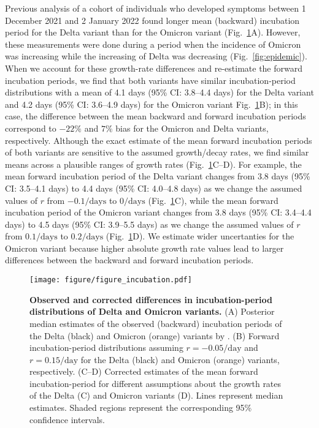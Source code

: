 \documentclass[12pt]{article}
\newcommand{\fref}[1]{Fig.~\ref{fig:#1}}
\begin{document}
Previous analysis of a cohort of individuals who developed symptoms between 1 December 2021 and 2 January 2022 found longer mean (backward) incubation period for the Delta variant than for the Omicron variant \citep{backer2021omicron} (\fref{incubation}A).
However, these measurements were done during a period when the incidence of Omicron was increasing while the increasing of Delta was decreasing (\fref{epidemic}).
When we account for these growth-rate differences and re-estimate the forward incubation periods, we find that both variants have similar incubation-period distributions with a mean of 4.1 days (95\% CI: 3.8--4.4 days) for the Delta variant and 4.2 days (95\% CI: 3.6--4.9 days) for the Omicron variant \fref{incubation}B);
in this case, the difference between the mean backward and forward incubation periods correspond to $-22\%$ and $7\%$ bias for the Omicron and Delta variants, respectively.
Although the exact estimate of the mean forward incubation periods of both variants are sensitive to the assumed growth/decay rates, we find similar means across a plausible ranges of growth rates (\fref{incubation}C--D).
For example, the mean forward incubation period of the Delta variant changes from 3.8 days (95\% CI: 3.5--4.1 days) to 4.4 days (95\% CI: 4.0--4.8 days) as we change the assumed values of $r$ from $-0.1/\mathrm{days}$ to $0/\mathrm{days}$ (\fref{incubation}C),
while the mean forward incubation period of the Omicron variant changes from 3.8 days (95\% CI: 3.4--4.4 days) to 4.5 days (95\% CI: 3.9--5.5 days) as we change the assumed values of $r$ from $0.1/\mathrm{days}$ to $0.2/\mathrm{days}$ (\fref{incubation}D).
We estimate wider uncertanties for the Omicron variant because higher absolute growth rate values lead to larger differences between the backward and forward incubation periods.

\begin{figure}[!th]
\texttt{[image: figure/figure\_incubation.pdf]}
\caption{
\textbf{Observed and corrected differences in incubation-period distributions of Delta and Omicron variants.}
(A) Posterior median estimates of the observed (backward) incubation periods of the Delta (black) and Omicron (orange) variants by \cite{backer2021omicron}.
(B) Forward incubation-period distributions assuming $r=-0.05/\mathrm{day}$ and $r=0.15/\mathrm{day}$ for the Delta (black) and Omicron (orange) variants, respectively.
(C--D) Corrected estimates of the mean forward incubation-period for different assumptions about the growth rates of the Delta (C) and Omicron variants (D).
Lines represent median estimates.
Shaded regions represent the corresponding 95\% confidence intervals.
\label{fig:incubation}
}
\end{figure}
\end{document}
